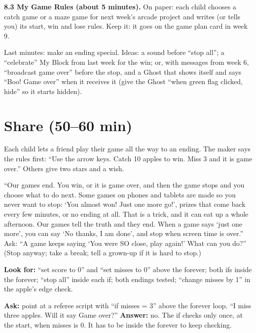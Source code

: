 \textbf{8.3 My Game Rules (about 5 minutes).} On paper: each child chooses a catch game or a maze game for next week's arcade project and writes (or tells you) its start, win and lose rules. Keep it: it goes on the game plan card in week 9.

\begin{freebuild}
Last minutes: make an ending special. Ideas: a sound before \enquote{stop all}; a \enquote{celebrate} My Block from last week for the win; or, with messages from week 6, \enquote{broadcast game over} before the stop, and a Ghost that shows itself and says \enquote{Boo! Game over} when it receives it (give the Ghost \enquote{when green flag clicked, hide} so it starts hidden).
\end{freebuild}

\section{Share (50--60 min)}
\begin{teacherscript}
Each child lets a friend play their game all the way to an ending. The maker says the rules first: \enquote{Use the arrow keys. Catch 10 apples to win. Miss 3 and it is game over.} Others give two stars and a wish.
\end{teacherscript}

\begin{safety}
\enquote{Our games end. You win, or it is game over, and then the game stops and you choose what to do next. Some games on phones and tablets are made so you never want to stop: \enquote{You almost won! Just one more go!}, prizes that come back every few minutes, or no ending at all. That is a trick, and it can eat up a whole afternoon. Our games tell the truth and they end. When a game says \enquote{just one more}, you can say \enquote{No thanks, I am done}, and stop when screen time is over.} Ask: \enquote{A game keeps saying \enquote{You were SO close, play again!} What can you do?} (Stop anyway; take a break; tell a grown-up if it is hard to stop.)
\end{safety}

\begin{formativecheck}
\textbf{Look for:} \enquote{set score to 0} and \enquote{set misses to 0} above the forever; both ifs inside the forever; \enquote{stop all} inside each if; both endings tested; \enquote{change misses by 1} in the apple's edge check.

\textbf{Ask:} point at a referee script with \enquote{if misses = 3} above the forever loop. \enquote{I miss three apples. Will it say Game over?}
\textbf{Answer:} no. The if checks only once, at the start, when misses is 0. It has to be inside the forever to keep checking.
\end{formativecheck}

